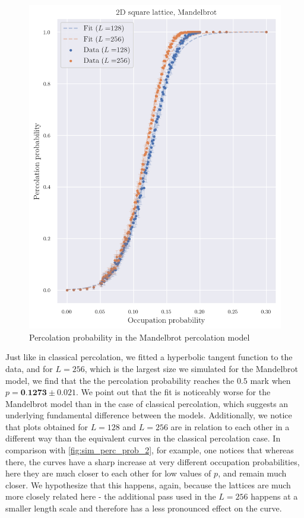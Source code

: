 \begin{figure}[H]
  \includegraphics[width=\linewidth]{Images/simm_perc_prob_2.png}
  \caption{Percolation probability in the Mandelbrot percolation model}
  \label{fig:simm_perc_prob_2}
\end{figure}

Just like in classical percolation, we fitted a hyperbolic tangent function to the data, and for $L=256$, which is the largest size we simulated for the Mandelbrot model, we find that the the percolation probability reaches the $0.5$ mark when $p=\textbf{0.1273} \pm 0.021$. We point out that the fit is noticeably worse for the Mandelbrot model than in the case of classical percolation, which suggests an underlying fundamental difference between the models. Additionally, we notice that plots obtained for $L=128$ and $L=256$ are in relation to each other in a different way than the equivalent curves in the classical percolation case. In comparison with \autoref{fig:sim_perc_prob_2}, for example, one notices that whereas there, the curves have a sharp increase at very different occupation probabilities, here they are much closer to each other for low values of $p$, and remain much closer. We hypothesize that this happens, again, because the lattices are much more closely related here - the additional pass used in the $L=256$ happens at a smaller length scale and therefore has a less pronounced effect on the curve.

